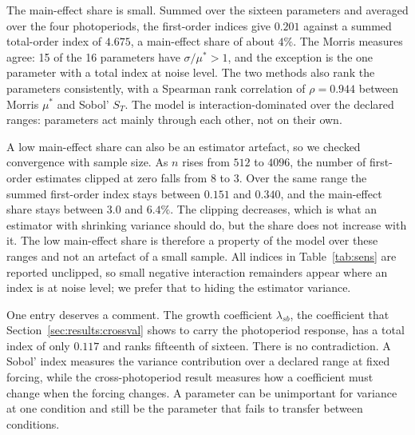 The main-effect share is small. Summed over the sixteen parameters and averaged
over the four photoperiods, the first-order indices give $0.201$ against a
summed total-order index of $4.675$, a main-effect share of about $4\%$. The
Morris measures agree: 15 of the 16 parameters have $\sigma/\mu^{*} > 1$, and
the exception is the one parameter with a total index at noise level. The two
methods also rank the parameters consistently, with a Spearman rank correlation
of $\rho = 0.944$ between Morris $\mu^{*}$ and Sobol' $S_T$. The model is
interaction-dominated over the declared ranges: parameters act mainly through
each other, not on their own.

A low main-effect share can also be an estimator artefact, so we checked
convergence with sample size. As $n$ rises from $512$ to $4096$, the number of
first-order estimates clipped at zero falls from $8$ to $3$. Over the same
range the summed first-order index stays between $0.151$ and $0.340$, and the
main-effect share stays between $3.0$ and $6.4\%$. The clipping decreases, which is what an
estimator with shrinking variance should do, but the share does not increase
with it. The low main-effect share is therefore a property of the model over
these ranges and not an artefact of a small sample. All indices in
Table~\ref{tab:sens} are reported unclipped, so small negative interaction
remainders appear where an index is at noise level; we prefer that to hiding
the estimator variance.

One entry deserves a comment. The growth coefficient $\lambda_{sb}$, the
coefficient that Section~\ref{sec:results:crossval} shows to carry the
photoperiod response, has a total index of only $0.117$ and ranks fifteenth of
sixteen. There is no contradiction. A Sobol' index measures the variance
contribution over a declared range at fixed forcing, while the
cross-photoperiod result measures how a coefficient must change when the
forcing changes. A parameter can be unimportant for variance at one condition
and still be the parameter that fails to transfer between conditions.


